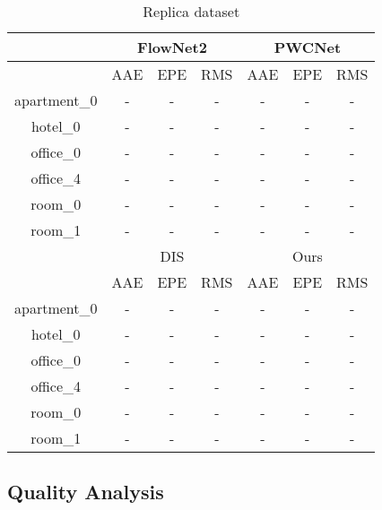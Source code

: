 \begin{table}[h!]
	\centering
	\begin{tabular}{ c | c | c | c | c | c | c }
		\hline
		     & \multicolumn{3}{c|}{FlowNet2} & \multicolumn{3}{c}{PWCNet} \\
		\hline
			 & AAE & EPE & RMS & AAE & EPE & RMS \\
		\hline
		apartment\_0 & - & - & -  & - & - & -  \\ 
		\hline
		hotel\_0 & - & - & -  & - & - & -  \\ 
		\hline
		office\_0 & - & - & - & - & - & -  \\ 
		\hline
		office\_4 & - & - & -  & - & - & -  \\ 
		\hline
		room\_0 & - & - & - & - & - & -  \\ 
		\hline
		room\_1 & - & - & -  & - & - & -  \\ 
		\hline\hline
			& \multicolumn{3}{c|}{DIS} & \multicolumn{3}{c}{Ours} \\
		\hline
			& AAE & EPE & RMS & AAE & EPE & RMS \\
		\hline
		apartment\_0 & - & - & -  & - & - & -  \\ 
		\hline
		hotel\_0 & - & - & -  & - & - & -  \\ 
		\hline
		office\_0 & - & - & - & - & - & -  \\ 
		\hline
		office\_4 & - & - & -  & - & - & -  \\ 
		\hline
		room\_0 & - & - & - & - & - & -  \\ 
		\hline
		room\_1 & - & - & -  & - & - & -  \\ 
		\hline
	\end{tabular}
	\caption{Replica dataset}
	\label{fig:exp:quality}
\end{table}

\subsection{Quality Analysis}





